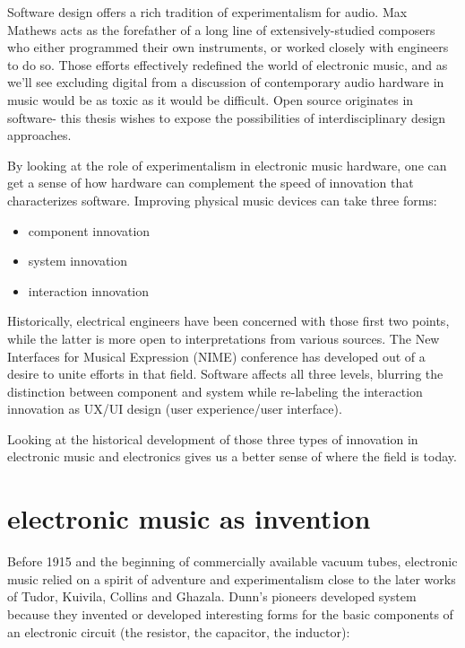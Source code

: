 Software design offers a rich tradition of experimentalism for audio. Max Mathews acts as the forefather of a long line of extensively-studied composers who either programmed their own instruments, or worked closely with engineers to do so. Those efforts effectively redefined the world of electronic music, and as we'll see excluding digital from a discussion of contemporary audio hardware in music would be as toxic as it would be difficult. Open source originates in software- this thesis wishes to expose the possibilities of interdisciplinary design approaches. 

	By looking at the role of experimentalism in electronic music hardware, one can get a sense of how hardware can complement the speed of innovation that characterizes software. Improving physical music devices can take three forms:  
	
\begin{itemize}
	
\item component innovation

\item system innovation 

\item interaction innovation  

\end{itemize}

Historically, electrical engineers have been concerned with those first two points, while the latter is more open to interpretations from various sources. The New Interfaces for Musical Expression (NIME) conference has developed out of a desire to unite efforts in that field. Software affects all three levels, blurring the distinction between component and system while re-labeling the interaction innovation as UX/UI design (user experience/user interface). 

Looking at the historical development of those three types of innovation in electronic music and electronics gives us a better sense of where the field is today. 

\section{electronic music as invention}

	Before 1915 and the beginning of commercially available vacuum tubes, electronic music relied on a spirit of adventure and experimentalism close to the later works of Tudor, Kuivila, Collins and Ghazala. Dunn's pioneers developed system because they invented or developed interesting forms for the basic components of an electronic circuit (the resistor, the capacitor, the inductor): 
	
